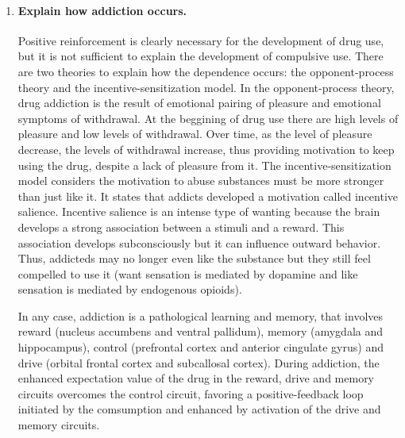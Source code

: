 \documentclass[12pt,article,oneside,a4paper]{memoir}
\begin{document}
\begin{enumerate}
\item \paragraph{Explain how addiction occurs.}
Positive reinforcement is clearly necessary for the development of drug use,
but it is not sufficient to explain the development of compulsive use. There
are two theories to explain how the dependence occurs: the opponent-process
theory and the incentive-sensitization model.
In the opponent-process theory, drug addiction is the result of emotional
pairing of pleasure and emotional symptoms of withdrawal. At the beggining of
drug use there are high levels of pleasure and low levels of withdrawal. Over
time, as the level of pleasure decrease, the levels of withdrawal increase,
thus providing motivation to keep using the drug, despite a lack of pleasure
from it.
The incentive-sensitization model considers the motivation to abuse substances
must be more stronger than just like it. It states that addicts developed a
motivation called incentive salience. Incentive salience is an intense type of
wanting because the brain develops a strong association between a stimuli and a
reward. This association develops subconsciously but it can influence outward
behavior. Thus, addicteds may no longer even like the substance but they still
feel compelled to use it (want sensation is mediated by dopamine and like
sensation is mediated by endogenous opioids).

In any case, addiction is a pathological learning and memory, that involves
reward (nucleus accumbens and ventral pallidum), memory (amygdala and
hippocampus), control (prefrontal cortex and anterior cingulate gyrus) and
drive (orbital frontal cortex and subcallosal cortex). During addiction, the
enhanced expectation value of the drug in the reward, drive and memory circuits
overcomes the control circuit, favoring a positive-feedback loop initiated by
the comsumption and enhanced by activation of the drive and memory circuits.


\end{enumerate}
\end{document}
